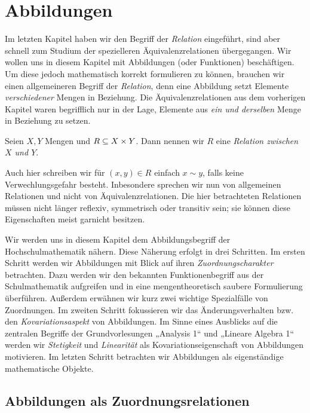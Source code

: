 \section{Abbildungen}
\label{sec:abb}

Im letzten Kapitel haben wir den Begriff der \emph{Relation} eingeführt, sind
aber schnell zum Studium der spezielleren Äquivalenzrelationen übergegangen. Wir
wollen uns in diesem Kapitel mit Abbildungen (oder Funktionen) beschäftigen. Um
diese jedoch mathematisch korrekt formulieren zu können, brauchen wir einen
allgemeineren Begriff der \emph{Relation}, denn eine Abbildung setzt Elemente
\emph{verschiedener} Mengen in Beziehung. Die Äquivalenzrelationen aus dem
vorherigen Kapitel waren begrifflich nur in der Lage, Elemente aus \emph{ein und
  derselben} Menge in Beziehung zu setzen.

\begin{defin}
  Seien $X,Y$ Mengen und $R \subseteq X\times Y$. Dann nennen wir $R$ eine
  \emph{Relation zwischen $X$ und $Y$}.
\end{defin}

Auch hier schreiben wir für $(x,y) \in R$ einfach $x \sim y$, falls keine
Verwechlungsgefahr besteht. Inbesondere sprechen wir nun von allgemeinen
Relationen und nicht von Äquivalenzrelationen. Die hier betrachteten Relationen
müssen nicht länger reflexiv, symmetrisch oder transitiv sein; sie können diese
Eigenschaften meist garnicht besitzen.

Wir werden uns in diesem Kapitel dem Abbildungsbegriff der Hochschulmathematik
nähern. Diese Näherung erfolgt in drei Schritten. Im ersten Schritt werden wir
Abbildungen mit Blick auf ihren \emph{Zuordnungscharakter} betrachten. Dazu
werden wir den bekannten Funktionenbegriff aus der Schulmathematik aufgreifen
und in eine mengentheoretisch saubere Formulierung überführen. Außerdem erwähnen
wir kurz zwei wichtige Spezialfälle von Zuordnungen. Im zweiten Schritt
fokussieren wir das Änderungsverhalten bzw. den \emph{Kovariationsaspekt} von
Abbildungen. Im Sinne eines Ausblicks auf die zentralen Begriffe der
Grundvorlesungen „Analysis 1“ und „Lineare Algebra 1“ werden wir
\emph{Stetigkeit} und \emph{Linearität} als Kovariationseigenschaft von
Abbildungen motivieren. Im letzten Schritt betrachten wir Abbildungen als
eigenständige mathematische Objekte.


\subsection{Abbildungen als Zuordnungsrelationen}


